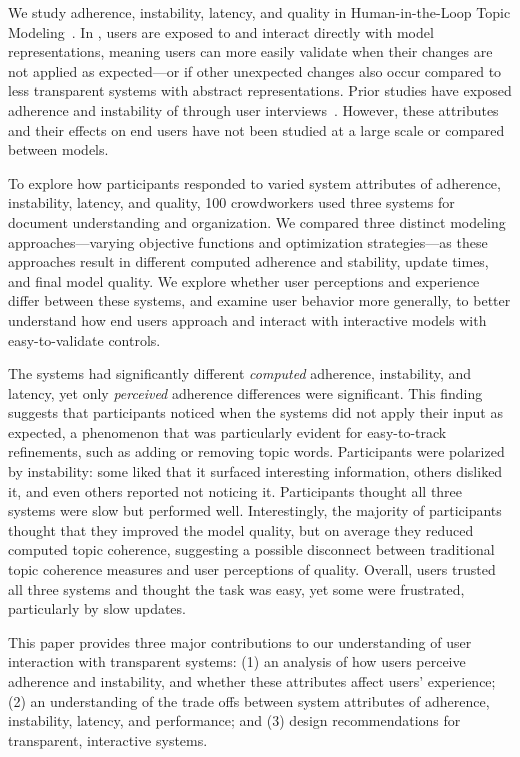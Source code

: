 We study adherence, instability, latency, and quality in Human-in-the-Loop Topic Modeling~\cite[\hltm{}]{Andrzejewski2009IncorporatingPriors}. In \hltm{}, users are exposed to and interact directly with model representations, meaning users can more easily validate when their changes are not applied as expected---or if other unexpected changes also occur compared to less transparent systems with abstract representations. Prior studies have exposed adherence and instability of \hltm{} through user interviews~\cite{Smith2018ClosingSystem,Lee2017TheModels}. However, these attributes and their effects on end users have
not been studied at a large scale or compared between models.

To explore how participants responded to varied system attributes of adherence, instability, latency, and quality, 100 crowdworkers used
three \hltm{} systems for document understanding and organization.  
We compared three distinct modeling approaches---varying objective functions and optimization strategies---as these approaches result in different computed adherence and stability, update times, and final model quality.
We explore whether user perceptions and experience differ between these systems,
and examine user behavior more generally, to better understand how end users approach and interact with interactive models with easy-to-validate controls.

The systems had significantly different \textit{computed} adherence, instability, and latency, yet only \textit{perceived} adherence differences were significant.
This finding suggests that participants noticed when the systems did not apply their input as expected, a phenomenon that  was particularly evident for easy-to-track refinements, such as adding or removing topic words. Participants were polarized by instability: some liked that it surfaced interesting information, others disliked it, and even others reported not noticing it.
Participants thought all three systems were slow but performed well. Interestingly, the majority of participants thought that they improved the model quality, but on average they reduced computed topic coherence, suggesting a possible disconnect between traditional topic coherence measures and user perceptions of \hltm{} quality.
Overall, users trusted all three systems and thought the task was easy, yet some were frustrated, particularly by slow updates.


This paper provides three major contributions to our understanding of user interaction with transparent systems:  (1) an analysis of how users perceive adherence and instability, and whether these attributes affect users' experience; (2) an understanding of the trade offs between system attributes of adherence, instability, latency, and performance; and (3) design recommendations for transparent, interactive systems.

